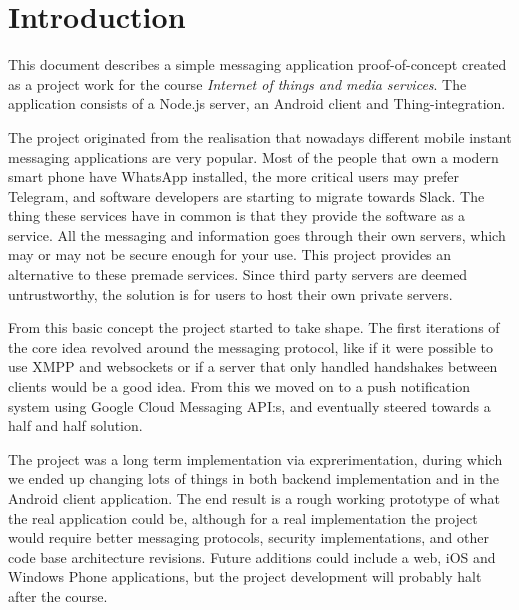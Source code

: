 
\section{Introduction}
This document describes a simple messaging application proof-of-concept created as a project work for the course \emph{Internet of things and media services}. The application consists of a Node.js server, an Android client and Thing\texttrademark-integration.

The project originated from the realisation that nowadays different mobile instant messaging applications are very popular. Most of the people that own a modern smart phone have WhatsApp installed, the more critical users may prefer Telegram, and software developers are starting to migrate towards Slack. The thing these services have in common is that they provide the software as a service. All the messaging and information goes through their own servers, which may or may not be secure enough for your use. This project provides an alternative to these premade services. Since third party servers are deemed untrustworthy, the solution is for users to host their own private servers.

From this basic concept the project started to take shape. The first iterations of the core idea revolved around the messaging protocol, like if it were possible to use XMPP and websockets or if a server that only handled handshakes between clients would be a good idea. From this we moved on to a push notification system using Google Cloud Messaging API:s, and eventually steered towards a half and half solution.

The project was a long term implementation via exprerimentation, during which we ended up changing lots of things in both backend implementation and in the Android client application. The end result is a rough working prototype of what the real application could be, although for a real implementation the project would require better messaging protocols, security implementations, and other code base architecture revisions. Future additions could include a web, iOS and Windows Phone applications, but the project development will probably halt after the course.

